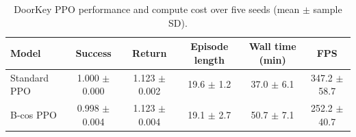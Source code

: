 \begin{table}[t]
\centering
\small
\caption{DoorKey PPO performance and compute cost over five seeds (mean $\pm$ sample SD).}
\label{tab:rq1-main-results}
\begin{tabular}{lccccc}
\toprule
Model & Success & Return & Episode length & Wall time (min) & FPS \\
\midrule
Standard PPO & 1.000 $\pm$ 0.000 & 1.123 $\pm$ 0.002 & 19.6 $\pm$ 1.2 & 37.0 $\pm$ 6.1 & 347.2 $\pm$ 58.7 \\
B-cos PPO & 0.998 $\pm$ 0.004 & 1.123 $\pm$ 0.004 & 19.1 $\pm$ 2.7 & 50.7 $\pm$ 7.1 & 252.2 $\pm$ 40.7 \\
\bottomrule
\end{tabular}
\end{table}

